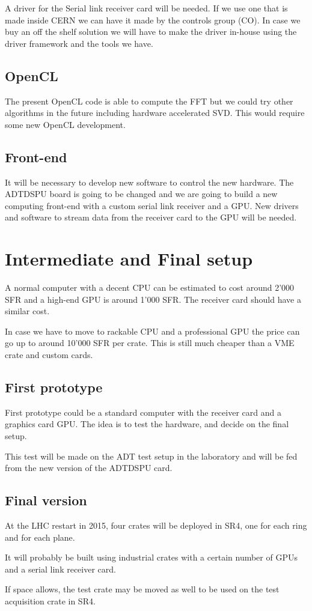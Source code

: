 A driver for the Serial link receiver card will be needed. If we use
one that is made inside \gls{CERN} we can have it made by the controls
group (CO). In case we buy an off the shelf solution we will have to
make the driver in-house using the driver framework and the tools we
have.

\subsection{OpenCL}

The present \gls{OpenCL} code is able to compute the \gls{FFT} but we could try other algorithms in the future including hardware accelerated \gls{SVD}. This would require some new \gls{OpenCL} development.

\subsection{Front-end}

It will be necessary to develop new software to control the new hardware. The \gls{ADTDSPU} board is going to be changed and we are going to build a new computing front-end with a custom serial link receiver and a \gls{GPU}. New drivers and software to stream data from the receiver card to the \gls{GPU} will be needed.

\section{Intermediate and Final setup}

A normal computer with a decent \gls{CPU} can be estimated to cost around 2'000 SFR and a high-end \gls{GPU} is around 1'000 SFR. The receiver card should have a similar cost.

In case we have to move to rackable \gls{CPU} and a professional \gls{GPU} the price can go up to around 10'000 SFR per crate. This is still much cheaper than a \gls{VME} crate and custom cards.

\subsection{First prototype}

First prototype could be a standard computer with the receiver card and a graphics card \gls{GPU}. The idea is to test the hardware, and decide on the final setup.

This test will be made on the \gls{ADT} test setup in the laboratory and will be fed from the new version of the \gls{ADTDSPU} card.

\subsection{Final version}

At the \gls{LHC} restart in 2015, four crates will be deployed in \gls{SR4}, one for each ring and for each plane.

It will probably be built using industrial crates with a certain number of \glspl{GPU} and a serial link receiver card. 

If space allows, the test crate may be moved as well to be used on the test acquisition crate in \gls{SR4}.
